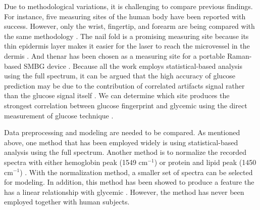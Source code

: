 Due to methodological variations, it is challenging to compare previous findings.
For instance, five measuring sites of the human body have been reported with success. 
However, only the wrist, fingertip, and forearm are being compared with the same methodology \citep{sitecompare}.
The nail fold is a promising measuring site because its thin epidermis layer makes it easier for the laser to reach the microvessel in the dermis \citep{ramanNailFold2019}.
And thenar has been chosen as a measuring site for a portable Raman-based SMBG device \citep{glucobeam}.
Because all the work employs statistical-based analysis using the full spectrum, it can be argued that the high accuracy of glucose prediction may be due to the contribution of correlated artifacts signal rather than the glucose signal itself \citep{directGlucose}.
We can determine which site produces the strongest correlation between glucose fingerprint and glycemic using the direct measurement of glucose technique \citep{directGlucose}.

Data preprocessing and modeling are needed to be compared. 
As mentioned above, one method that has been employed widely is using statistical-based analysis using the full spectrum.
Another method is to normalize the recorded spectra with either hemoglobin peak (1549 $\text{cm}^{-1}$) \citep{solutionGlucose} or protein and lipid peak (1450 $\text{cm}^{-1}$) \citep{directGlucose}.
With the normalization method, a smaller set of spectra can be selected for modeling.
In addition, this method has been showed to produce a feature the has a linear relationship with glycemic \citep{solutionGlucose,directGlucose}.
However, the method has never been employed together with human subjects.



